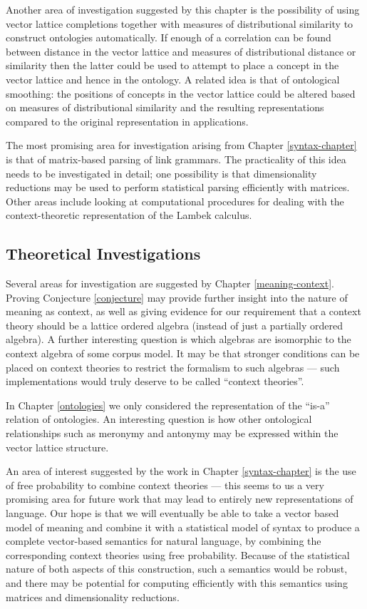 Another area of investigation suggested by this chapter is the possibility of using vector lattice completions together with measures of distributional similarity to construct ontologies automatically. If enough of a correlation can be found between distance in the vector lattice and measures of distributional distance or similarity then the latter could be used to attempt to place a concept in the vector lattice and hence in the ontology. A related idea is that of ontological smoothing: the positions of concepts in the vector lattice could be altered based on measures of distributional similarity and the resulting representations compared to the original representation in applications.

The most promising area for investigation arising from Chapter \ref{syntax-chapter} is that of matrix-based parsing of link grammars. The practicality of this idea needs to be investigated in detail; one possibility is that dimensionality reductions may be used to perform statistical parsing efficiently with matrices. Other areas include looking at computational procedures for dealing with the context-theoretic representation of the Lambek calculus.

\subsection{Theoretical Investigations}

Several areas for investigation are suggested by Chapter \ref{meaning-context}. Proving Conjecture \ref{conjecture} may provide further insight into the nature of meaning as context, as well as giving evidence for our requirement that a context theory should be a lattice ordered algebra (instead of just a partially ordered algebra). A further interesting question is which algebras are isomorphic to the context algebra of some corpus model. It may be that stronger conditions can be placed on context theories to restrict the formalism to such algebras --- such implementations would truly deserve to be called ``context theories''.

In Chapter \ref{ontologies} we only considered the representation of the ``is-a'' relation of ontologies. An interesting question is how other ontological relationships such as meronymy and antonymy may be expressed within the vector lattice structure.

An area of interest suggested by the work in Chapter \ref{syntax-chapter} is the use of free probability to combine context theories --- this seems to us a very promising area for future work that may lead to entirely new representations of language. Our hope is that we will eventually be able to take a vector based model of meaning and combine it with a statistical model of syntax to produce a complete vector-based semantics for natural language, by combining the corresponding context theories using free probability. Because of the statistical nature of both aspects of this construction, such a semantics would be robust, and there may be potential for computing efficiently with this semantics using matrices and dimensionality reductions.

